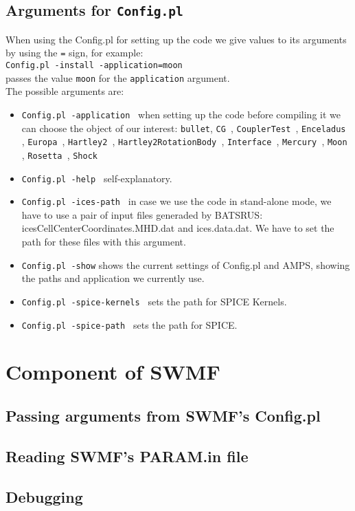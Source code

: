 \subsection{Arguments for {\tt Config.pl}}
When using the Config.pl for setting up the code we give values to its arguments by using the {\tt =} sign, for example:\\
{\tt Config.pl -install -application=moon}\\
passes the value {\tt moon} for the {\tt application} argument.\\
The possible arguments are:
\begin{itemize}
\item {\tt Config.pl -application } when setting up the code before compiling it we can choose the object of our interest: {\tt  bullet}, {\tt CG }, {\tt CouplerTest }, {\tt Enceladus }, {\tt Europa }, {\tt Hartley2 }, {\tt Hartley2RotationBody }, {\tt Interface }, {\tt Mercury }, {\tt Moon }, {\tt Rosetta }, {\tt Shock}\\
\item {\tt Config.pl -help } self-explanatory.\\
\item {\tt Config.pl -ices-path } in case we use the code in stand-alone mode, we have to use a pair of input files generaded by BATSRUS: icesCellCenterCoordinates.MHD.dat and ices.data.dat. We have to set the path for these files with this argument. \\
\item {\tt Config.pl -show} shows the current settings of Config.pl and AMPS, showing the paths and application we currently use.\\
\item {\tt Config.pl -spice-kernels } sets the path for SPICE Kernels.\\
\item {\tt Config.pl -spice-path } sets the path for SPICE.\\
\end{itemize}



\section {Component of SWMF}
\subsection {Passing arguments from SWMF's Config.pl}
\subsection {Reading SWMF's PARAM.in file}
\subsection {Debugging}




